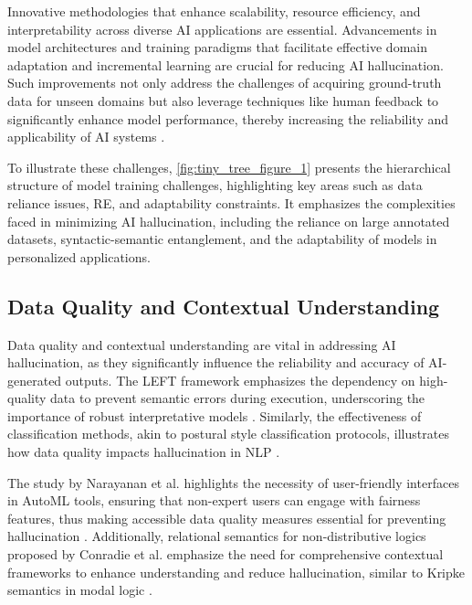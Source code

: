 Innovative methodologies that enhance scalability, resource efficiency, and interpretability across diverse AI applications are essential. Advancements in model architectures and training paradigms that facilitate effective domain adaptation and incremental learning are crucial for reducing AI hallucination. Such improvements not only address the challenges of acquiring ground-truth data for unseen domains but also leverage techniques like human feedback to significantly enhance model performance, thereby increasing the reliability and applicability of AI systems \cite{park2023domainadaptationbasedhuman}.

To illustrate these challenges, \autoref{fig:tiny_tree_figure_1} presents the hierarchical structure of model training challenges, highlighting key areas such as data reliance issues, RE, and adaptability constraints. It emphasizes the complexities faced in minimizing AI hallucination, including the reliance on large annotated datasets, syntactic-semantic entanglement, and the adaptability of models in personalized applications.


\subsection{Data Quality and Contextual Understanding} \label{subsec:Data Quality and Contextual Understanding}

Data quality and contextual understanding are vital in addressing AI hallucination, as they significantly influence the reliability and accuracy of AI-generated outputs. The LEFT framework emphasizes the dependency on high-quality data to prevent semantic errors during execution, underscoring the importance of robust interpretative models \cite{hsu2023whatsleftconceptgrounding}. Similarly, the effectiveness of classification methods, akin to postural style classification protocols, illustrates how data quality impacts hallucination in NLP \cite{chambaz2012classificationposturalstyle}.

The study by Narayanan et al. highlights the necessity of user-friendly interfaces in AutoML tools, ensuring that non-expert users can engage with fairness features, thus making accessible data quality measures essential for preventing hallucination \cite{narayanan2023democratizecareneedfairness}. Additionally, relational semantics for non-distributive logics proposed by Conradie et al. emphasize the need for comprehensive contextual frameworks to enhance understanding and reduce hallucination, similar to Kripke semantics in modal logic \cite{conradie2021nondistributivelogicssemanticsmeaning}.

